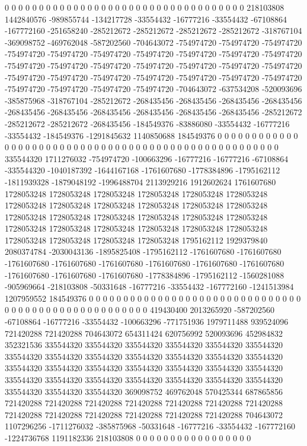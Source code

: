 0 0 0 0 0 0 0 0 0 0 0 0 0 0 0 0 0 0 0 0 0 0 0 0 0 0 0 0 0 0 0 0 0 0 0 218103808 1442840576 -989855744 -134217728 -33554432 -16777216 -33554432 -67108864 -167772160 -251658240 -285212672 -285212672 -285212672 -285212672 -318767104 -369098752 -469762048 -587202560 -704643072 -754974720 -754974720 -754974720 -754974720 -754974720 -754974720 -754974720 -754974720 -754974720 -754974720 -754974720 -754974720 -754974720 -754974720 -754974720 -754974720 -754974720 -754974720 -754974720 -754974720 -754974720 -754974720 -754974720 -754974720 -754974720 -754974720 -754974720 -754974720 -704643072 -637534208 -520093696 -385875968 -318767104 -285212672 -268435456 -268435456 -268435456 -268435456 -268435456 -268435456 -268435456 -268435456 -268435456 -268435456 -285212672 -285212672 -285212672 -268435456 -184549376 -83886080 -33554432 -16777216 -33554432 -184549376 -1291845632 1140850688 184549376 0 0 0 0 0 0 0 0 0 0 0 0 0 0 0 0 0
0 0 0 0 0 0 0 0 0 0 0 0 0 0 0 0 0 0 0 0 0 0 0 0 0 0 0 0 0 0 0 0 0 0 0 335544320 1711276032 -754974720 -100663296 -16777216 -16777216 -67108864 -335544320 -1040187392 -1644167168 -1761607680 -1778384896 -1795162112 -1811939328 -1879048192 -1996488704 2113929216 1912602624 1761607680 1728053248 1728053248 1728053248 1728053248 1728053248 1728053248 1728053248 1728053248 1728053248 1728053248 1728053248 1728053248 1728053248 1728053248 1728053248 1728053248 1728053248 1728053248 1728053248 1728053248 1728053248 1728053248 1728053248 1728053248 1728053248 1728053248 1728053248 1728053248 1795162112 1929379840 2080374784 -2030043136 -1895825408 -1795162112 -1761607680 -1761607680 -1761607680 -1761607680 -1761607680 -1761607680 -1761607680 -1761607680 -1761607680 -1761607680 -1761607680 -1778384896 -1795162112 -1560281088 -905969664 -218103808 -50331648 -16777216 -33554432 -167772160 -1241513984 1207959552 184549376 0 0 0 0 0 0 0 0 0 0 0 0 0 0 0 0 0
0 0 0 0 0 0 0 0 0 0 0 0 0 0 0 0 0 0 0 0 0 0 0 0 0 0 0 0 0 0 0 0 0 0 0 419430400 2013265920 -587202560 -67108864 -16777216 -33554432 -100663296 -771751936 1979711488 939524096 721420288 721420288 704643072 654311424 620756992 520093696 452984832 352321536 335544320 335544320 335544320 335544320 335544320 335544320 335544320 335544320 335544320 335544320 335544320 335544320 335544320 335544320 335544320 335544320 335544320 335544320 335544320 335544320 335544320 335544320 335544320 335544320 335544320 335544320 335544320 335544320 335544320 335544320 369098752 469762048 570425344 687865856 721420288 721420288 721420288 721420288 721420288 721420288 721420288 721420288 721420288 721420288 721420288 721420288 721420288 704643072 1107296256 -1711276032 -385875968 -50331648 -16777216 -33554432 -167772160 -1224736768 1191182336 218103808 0 0 0 0 0 0 0 0 0 0 0 0 0 0 0 0 0
